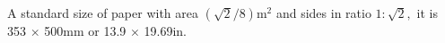 A standard size of paper with area $ ( \sqrt{2} / 8 ) \mathrm{m}^2 $ and sides in ratio
$ 1 : \sqrt{2} , $ it is 353 \ensuremath{ \times } 500mm or 13.9 \ensuremath{ \times } 19.69in.